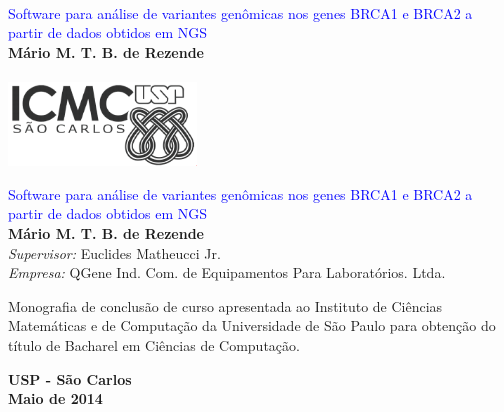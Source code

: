 \documentclass[12pt,times,a4paper,twoside]{icmc}
\newcommand{\tituloMonografia}{Software para análise de variantes genômicas nos genes BRCA1 e BRCA2 a partir de dados obtidos em NGS}
\newcommand{\nomeAluno}{Mário M. T. B. de Rezende}
\newcommand{\nomeSupervisor}{Euclides Matheucci Jr.}
\newcommand{\nomeEmpresa}{QGene Ind. Com. de Equipamentos Para Laboratórios. Ltda.}
\begin{document}

\begin{titlepage}   
	\pagestyle{empty} %

	\begin{center} 
    \begin{minipage}[c]{12cm}
    \begin{center}
      \vspace{.35\textheight}
      \hrulefill\\
      \vspace{.5cm} {\Large \textcolor{blue}{\tituloMonografia}}\\
      \vspace{1.3cm}
      \textbf{\nomeAluno}\\
      \vspace{.5cm}
      \hrulefill\\
    \vspace{5cm}
    \includegraphics[width=5cm]{img/logoICMC.png}
    \end{center}
    \end{minipage}
  \end{center} 
  

  \cleardoublepage
 

  \vspace*{3cm}
  \begin{center}
    {\huge\sf \textcolor{blue}{\tituloMonografia}} \\
    \vspace*{2cm}
    {\bf \nomeAluno} \\
    \vspace*{2cm}
    \emph{Supervisor:}  {\nomeSupervisor}\\
    \emph{Empresa:}  {\nomeEmpresa}
  \end{center}
  \vspace*{3cm}

  \begin{flushright}
    \begin{minipage}{10cm}
      Monografia de conclusão de curso apresentada ao
Instituto de Ciências Matemáticas e de Computação da Universidade de São Paulo para obtenção do título de Bacharel em
Ciências de Computação.
    \end{minipage}
  \end{flushright}

  \vspace*{2cm}
  \begin{center}
    \textbf{USP - São Carlos \\ Maio de 2014}
  \end{center}
  
  \cleardoublepage  
  
\end{titlepage}
\end{document}
